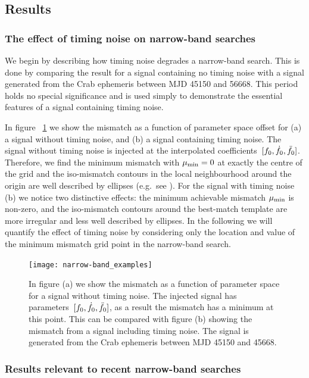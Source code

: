 \documentclass[../full_thesis/full_thesis.tex]{subfiles}
\begin{document}
\subsection{Results}
\label{sec: narrow-band results}
\subsubsection{The effect of timing noise on narrow-band searches} We begin by
describing how timing noise degrades a narrow-band search. This is done by
comparing the result for a signal containing no timing noise with a signal
generated from the Crab ephemeris between MJD 45150 and 56668. This period
holds no special significance and is used simply to demonstrate the essential
features of a signal containing timing noise.

In figure ~\ref{fig: narrow-band example} we show the mismatch as a function of
parameter space offset for (a) a signal without timing noise, and (b) a signal
containing timing noise. The signal without timing noise is injected at the
interpolated coefficients~$[f_{0}, \dot{f}_{0}, \ddot{f}_{0}]$.  Therefore, we find
the minimum mismatch with $\mu_{\mathrm{min}}=0$ at exactly the centre of the grid and the
iso-mismatch contours in the local neighbourhood around the origin are well
described by ellipses (e.g.\ see \citet{Prix2007}).  For the signal with timing
noise (b) we notice two distinctive effects: the minimum achievable mismatch
$\mu_{\mathrm{min}}$ is non-zero, and the iso-mismatch contours around the best-match
template are more irregular and less well described by ellipses.  In the
following we will quantify the effect of timing noise by considering only the
location and value of the minimum mismatch grid point in the narrow-band
search.
\begin{figure}[htb]
\centering
\texttt{[image: narrow-band\_examples]}
\caption{In figure (a) we show the mismatch as a function of parameter space
    for a signal without timing noise. The injected signal has
    parameters~$[f_{0}, \dot{f}_{0}, \ddot{f}_{0}]$, as a result the mismatch has
    a minimum at this point. This can be compared with figure (b) showing the
mismatch from a signal including timing noise. The signal is generated from the
Crab ephemeris between MJD 45150 and 45668.}
\label{fig: narrow-band example}
\end{figure}


\subsubsection{Results relevant to recent narrow-band searches}
\end{document}
